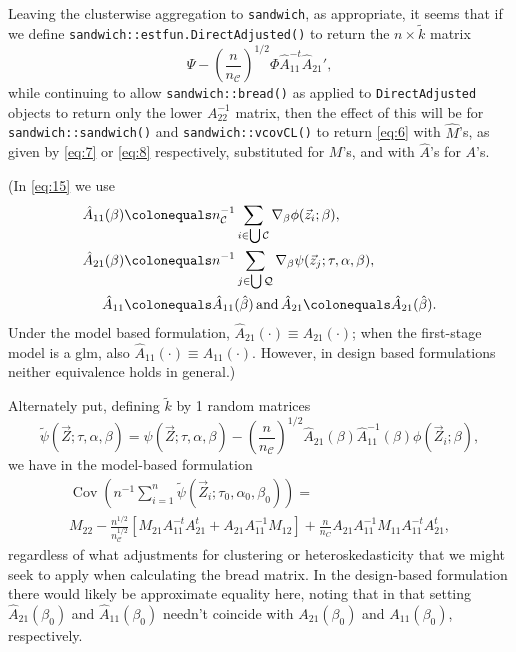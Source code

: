 \documentclass{article}
\newcommand{\defeq}{\ensuremath{\colonequals}}
\begin{document}
Leaving the clusterwise aggregation to \texttt{sandwich}, as
appropriate, it seems that if we define
\texttt{sandwich::estfun.DirectAdjusted()} to return the $n \times \tilde{k}$ matrix
\begin{equation} \label{eq:15}
  \Psi -
  \left(\frac{n}{n_{\mathcal{C}}}\right)^{1/2}\Phi
  \hat{A}_{11}^{-t}\hat{A}_{21}', 
\end{equation}
while continuing to allow \texttt{sandwich::bread()} as applied to
\texttt{DirectAdjusted} objects to return only
the lower $A_{22}^{-1}$ matrix, then the effect of this will be for \texttt{sandwich::sandwich()}
and \texttt{sandwich::vcovCL()} to return \eqref{eq:6} with
$\hat{M}$'s,  as
given by \eqref{eq:7} or \eqref{eq:8} respectively, substituted for
$M$'s, and with $\hat{A}$'s for $A$'s.

(In \eqref{eq:15}
we use
\begin{align*}
  \hat{A}_{11}(\beta) &\defeq  n_{\mathcal{C}}^{-1}\sum_{i\in \bigcup
        \mathcal{C}}\nabla_{\beta}\phi(\vec{z}_{i};
        \beta ),\\
  \hat{A}_{21}(\beta) &\defeq n^{-1}\sum_{j\in \bigcup
        \mathcal{Q}}\nabla_{\beta}\psi(\vec{z}_{j};
        \tau, \alpha, \beta ),\\
  \hat{A}_{11}&\defeq \hat{A}_{11}(\hat\beta)\, \text{and}\, \hat{A}_{21}\defeq \hat{A}_{21}(\hat\beta).
\end{align*}
Under the model based
formulation, $\hat{A}_{21}(\cdot) \equiv {A}_{21}(\cdot)$; when the
first-stage model is a glm, also $\hat{A}_{11}(\cdot) \equiv
{A}_{11}(\cdot)$.  However, in design based formulations neither
equivalence holds in general.)

Alternately put,
defining $\tilde{k}$ by 1 random matrices 
\begin{equation}\label{eq:10}
    \tilde{\psi}(\vec{Z}; \tau, \alpha, 
    \beta) = \psi (\vec{Z}; \tau,\alpha, 
    \beta) -
    \left(\frac{n}{n_{\mathcal{C}}}\right)^{1/2}
    \hat{A}_{21}(\beta) \hat{A}_{11}^{-1}(\beta)\phi(\vec{Z}_{i};
    \beta), 
\end{equation}
we have in the model-based formulation 
\begin{multline*}
  \operatorname{Cov}\left(n^{-1}\sum_{i=1}^{n} \tilde{\psi}(\vec{Z}_{i}; \tau_{0},\alpha_{0},
    \beta_{0})\right) = \\
  M_{22} -
                                 \frac{n^{1/2}}{n_{\mathcal{C}}^{1/2}}[M_{21}A_{11}^{-t}A_{21}^t
                                 + A_{21}A_{11}^{-1}M_{12}] +
                                 \frac{n}{n_C}A_{21}A_{11}^{-1}M_{11}A_{11}^{-t}A_{21}^{t},
                               \end{multline*}
regardless of what adjustments for
clustering or heteroskedasticity that we might seek to apply when
calculating the bread matrix.   In the design-based formulation there
would likely be approximate equality here, noting that in that setting
$\hat{A}_{21}(\beta_{0})$ and $\hat{A}_{11}(\beta_{0})$ needn't
coincide with ${A}_{21}(\beta_{0})$ and ${A}_{11}(\beta_{0})$, respectively.
\end{document}
